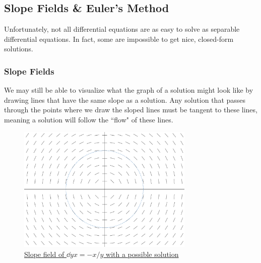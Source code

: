 \subsection{Slope Fields \& Euler's Method}
Unfortunately, not all differential equations are as easy to solve as separable differential equations.
In fact, some are impossible to get nice, closed-form solutions.
\subsubsection{Slope Fields}
We may still be able to visualize what the graph of a solution might look like by drawing lines that have the same slope as a solution.
Any solution that passes through the points where we draw the sloped lines must be tangent to these lines, meaning a solution will follow the ``flow" of these lines.

\begin{figure}[H]
	\label{slope_field}
	\centering
	\includegraphics[width=0.75\textwidth]{./applications_integrals/slope_field.png}
	\caption{\hyperref{}{}{}{Slope field of $\dd{y}{x}=-x/y$ with a possible solution}}
\end{figure}

